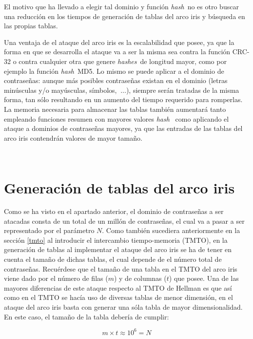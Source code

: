 \documentclass[12pt,spanish,listoffigures,listoftables]{tfgetsinf}
\newcommand{\hash}{\textit{hash}}
\newcommand{\hashes}{\textit{hashes}}
\begin{document}
El motivo que ha llevado a elegir tal dominio y función \hash~no es otro buscar una reducción en los tiempos de generación de tablas del arco iris y búsqueda en las propias tablas.

Una ventaja de el ataque del arco iris es la escalabilidad que posee, ya que la forma en que se desarrolla el ataque va a ser la misma sea contra la función CRC-32 o contra cualquier otra que genere \hashes~de longitud mayor, como por ejemplo la función \hash~MD5. Lo mismo se puede aplicar a el dominio de contraseñas: aunque más posibles contraseñas existan en el dominio (letras minúsculas y/o mayúsculas, símbolos, $~\dots$), siempre serán tratadas de la misma forma, tan sólo resultando en un aumento del tiempo requerido para romperlas. La memoria necesaria para almacenar las tablas también aumentará tanto empleando funciones resumen con mayores valores \hash~ como aplicando el ataque a dominios de contraseñas mayores, ya que las entradas de las tablas del arco iris contendrán valores de mayor tamaño.

~\\

\section{Generación de tablas del arco iris}

Como se ha visto en el apartado anterior, el dominio de contraseñas a ser atacadas consta de un total de un millón de contraseñas, el cual va a pasar a ser representado por el parámetro $N$. Como también sucediera anteriormente en la sección \ref{tmto} al introducir el intercambio tiempo-memoria (TMTO), en la generación de tablas al implementar el ataque del arco iris se ha de tener en cuenta el tamaño de dichas tablas, el cual depende de el número total de contraseñas. Recuérdese que el tamaño de una tabla en el TMTO  del arco iris viene dado por el número de filas ($m$) y de columnas ($t$) que posee. Una de las mayores diferencias de este ataque respecto al TMTO de Hellman es que así como en el TMTO se hacía uso de diversas tablas de menor dimensión, en el ataque del arco iris basta con generar una sóla tabla de mayor dimensionalidad. En este caso, el tamaño de la tabla debería de cumplir:

\begin{center}
    \begin{equation}
        \tag{Fórmula 1}
        m \times t \approx 10^6 = N
        \label{tamaño}
    \end{equation}
\end{center}
~\\
\end{document}
